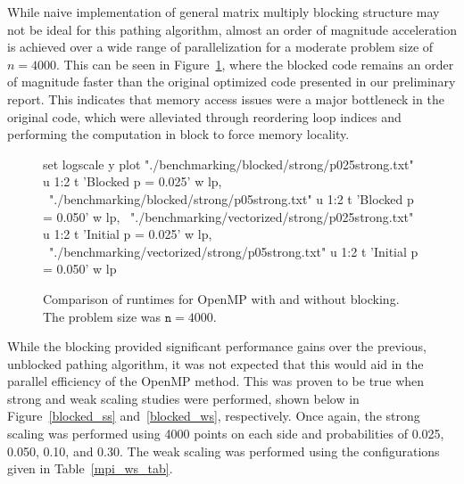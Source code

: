 \documentclass[11pt]{article}
\begin{document}
\noindent While naive implementation of general matrix multiply blocking structure may not be ideal for this pathing algorithm, almost an order of magnitude acceleration is achieved over a wide range of parallelization for a moderate problem size of $n = 4000$. This can be seen in Figure~\ref{blocked_faster}, where the blocked code remains an order of magnitude faster than the original optimized code presented in our preliminary report. This indicates that memory access issues were a major bottleneck in the original code, which were alleviated through reordering loop indices and performing the computation in block to force memory locality.
\begin{figure}[h]
	\begin{center}
		\begin{gnuplot}[terminal=cairolatex, terminaloptions= color] 
			set logscale y
			plot "./benchmarking/blocked/strong/p025strong.txt" u 1:2 t 'Blocked p = 0.025' w lp, \
			"./benchmarking/blocked/strong/p05strong.txt" u 1:2 t 'Blocked p = 0.050' w lp, \
			"./benchmarking/vectorized/strong/p025strong.txt" u 1:2 t 'Initial p = 0.025' w lp, \
			"./benchmarking/vectorized/strong/p05strong.txt" u 1:2 t 'Initial p = 0.050' w lp
		\end{gnuplot}
		\caption{Comparison of runtimes for OpenMP with and without blocking. The problem size was $\mathtt{n} = 4000$.}
		\label{blocked_faster}
	\end{center}
\end{figure}
\newpage
\noindent While the blocking provided significant performance gains over the previous, unblocked pathing algorithm, it was not expected that this would aid in the parallel efficiency of the OpenMP method. This was proven to be true when strong and weak scaling studies were performed, shown below in Figure~\ref{blocked_ss} and~\ref{blocked_ws}, respectively. Once again, the strong scaling was performed using 4000 points on each side and probabilities of 0.025, 0.050, 0.10, and 0.30. The weak scaling was performed using the configurations given in Table~\ref{mpi_ws_tab}.
\end{document}
